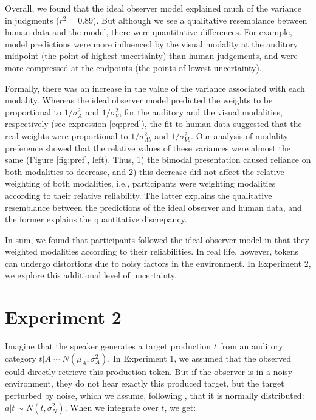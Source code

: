 \documentclass[10pt,letterpaper]{article}
\begin{document}
Overall, we found that the ideal observer model explained much of the variance in judgments ($r^2=0.89$). But although we see a qualitative resemblance between human data and the model, there were quantitative differences. For example, model predictions were more influenced by the visual modality at the auditory midpoint (the point of highest uncertainty) than human judgements, and were more compressed at the endpoints (the points of lowest uncertainty).

Formally, there was an increase in the value of the variance associated with each modality. Whereas the ideal observer model predicted the weights to be proportional to $1/\sigma^2_{A}$ and $1/\sigma^2_{V}$, for the auditory and the visual modalities, respectively (see expression \ref{eq:pred}), the fit to human data suggested that the real weights were proportional to $1/\sigma^2_{Ab}$ and $1/\sigma^2_{Vb}$. Our analysis of modality preference showed that the relative values of these variances were almost the same (Figure \ref{fig:pref}, left). Thus, 1) the bimodal presentation caused reliance on both modalities to decrease, and 2) this decrease did not affect the relative weighting of both modalities, i.e., participants were weighting modalities according to their relative reliability. The latter explains the qualitative resemblance between the predictions of the ideal observer and human data, and the former explains the quantitative discrepancy.


In sum, we found that participants followed the ideal observer model in that they weighted modalities according to their reliabilities. In real life, however, tokens can undergo distortions due to noisy factors in the environment. In Experiment 2, we explore this additional level of uncertainty.

\section{Experiment 2}

Imagine that the speaker generates a target production $t$ from an auditory category
$t | A \sim N(\mu_{A}, \sigma^2_{A})$. In Experiment 1, we assumed that the observed could directly retrieve this production token. But if the observer is in a noisy environment, they do not hear exactly this produced target, but the target perturbed by noise, which we assume, following , that it is normally distributed: $a | t \sim N(t, \sigma^2_{N})$. When we integrate over $t$, we get:
\end{document}
